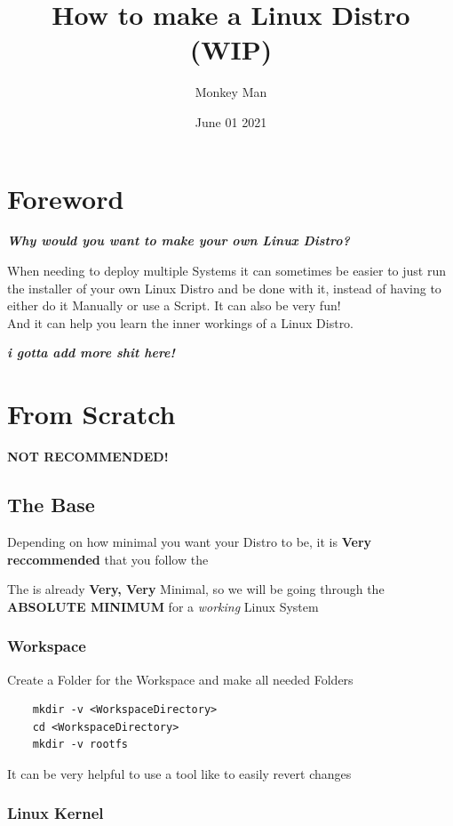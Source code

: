 \documentclass{article}
\author{Monkey Man}
\title{How to make a Linux Distro (WIP)}
\date{June 01 2021}
\begin{document}
\maketitle
\tableofcontents

\section{Foreword}
	\textit{\textbf{Why would you want to make your own Linux Distro?}}

	When needing to deploy multiple Systems it can sometimes be easier to just run the installer of your own Linux Distro and be done with it, instead of having to either do it Manually or use a Script. It can also be very fun!
	\\And it can help you learn the inner workings of a Linux Distro.

	\textit{\textbf{i gotta add more shit here!}}

\section{From Scratch}
\textbf{NOT RECOMMENDED!}
\subsection{The Base}
	Depending on how minimal you want your Distro to be, it is \textbf{Very reccommended} that you follow the 

	The  is already \textbf{Very, Very} Minimal, so we will be going through the \textbf{ABSOLUTE MINIMUM} for a \textit{working} Linux System 
		\subsubsection{Workspace}
			Create a Folder for the Workspace and make all needed Folders
			
			\begin{lstlisting}
	mkdir -v <WorkspaceDirectory>
	cd <WorkspaceDirectory>
	mkdir -v rootfs
			\end{lstlisting}

			It can be very helpful to use a tool like  to easily revert changes
		\subsubsection{Linux Kernel}
\end{document}
